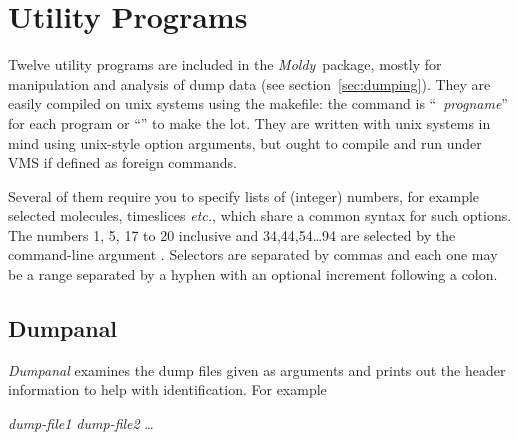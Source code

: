 \documentclass[a4paper,twoside]{report}
\newcommand{\moldy}{\emph{Moldy}}
\newcommand{\etc}{\emph{etc.}}
\begin{document}
\chapter{Utility Programs} %
Twelve utility programs are included in the \moldy\ package, mostly for
manipulation and analysis of dump data (see section~\ref{sec:dumping}).
They are easily compiled on unix systems using the makefile: the
command is ``~\emph{progname}'' for each program or
``'' to make the lot.  They are written with
unix systems in mind using unix-style option arguments, but ought to
compile and run under VMS if defined as foreign commands.

Several of them require you to specify lists of (integer) numbers, for
example selected molecules, timeslices \etc, which share a common
syntax for such options. The numbers 1, 5, 17 to 20 inclusive and
34,44,54\ldots94 are selected by the command-line argument
\mbox{}.  Selectors are separated by
commas and each one may be a range separated by a hyphen with an
optional increment following a colon.

\section{Dumpanal}%
\emph{Dumpanal} examines the dump files given as arguments and
prints out the header information to help with identification. For
example
\begin{center}
 \textit{dump-file1 dump-file2} \ldots
\end{center}

\end{document}
